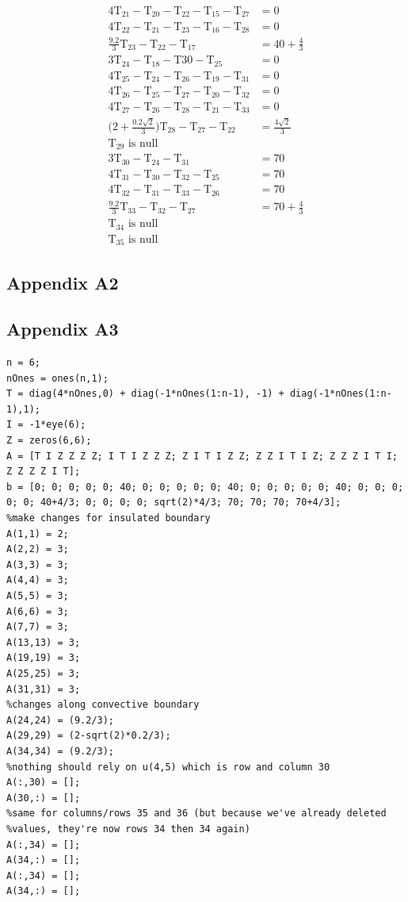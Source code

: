 \documentclass[12pt,a4paper]{article}
\begin{document}
\begin{align*}
4\text{T}_{21}-\text{T}_{20}-\text{T}_{22}-\text{T}_{15}-\text{T}_{27} & =0\\
4\text{T}_{22}-\text{T}_{21}-\text{T}_{23}-\text{T}_{16}-\text{T}_{28} & =0\\
\frac{9.2}{3}\text{T}_{23}-\text{T}_{22}-\text{T}_{17} & =40+\frac{4}{3}\\
3\text{T}_{24}-\text{T}_{18}-\text{T}{30}-\text{T}_{25} &=0\\
4\text{T}_{25}-\text{T}_{24}-\text{T}_{26}-\text{T}_{19}-\text{T}_{31} & =0\\
4\text{T}_{26}-\text{T}_{25}-\text{T}_{27}-\text{T}_{20}-\text{T}_{32} & =0\\
4\text{T}_{27}-\text{T}_{26}-\text{T}_{28}-\text{T}_{21}-\text{T}_{33} & =0\\
\bigg(2+\frac{0.2\sqrt{2}}{3}\bigg)\text{T}_{28}-\text{T}_{27}-\text{T}_{22} & =\frac{4\sqrt{2}}{3}\\
\text{T}_{29} \text{ is null}\\
3\text{T}_{30}-\text{T}_{24}-\text{T}_{31} &=70\\
4\text{T}_{31}-\text{T}_{30}-\text{T}_{32}-\text{T}_{25} &=70\\
4\text{T}_{32}-\text{T}_{31}-\text{T}_{33}-\text{T}_{26} &=70\\
\frac{9.2}{3}\text{T}_{33}-\text{T}_{32}-\text{T}_{27} & =70+\frac{4}{3}\\
\text{T}_{34} \text{ is null}\\
\text{T}_{35} \text{ is null}
\end{align*}
\subsection*{Appendix A2}
\pagebreak
\subsection*{Appendix A3}
\begin{verbatim}
n = 6;
nOnes = ones(n,1);
T = diag(4*nOnes,0) + diag(-1*nOnes(1:n-1), -1) + diag(-1*nOnes(1:n-1),1);
I = -1*eye(6);
Z = zeros(6,6);
A = [T I Z Z Z Z; I T I Z Z Z; Z I T I Z Z; Z Z I T I Z; Z Z Z I T I; Z Z Z Z I T];
b = [0; 0; 0; 0; 0; 40; 0; 0; 0; 0; 0; 40; 0; 0; 0; 0; 0; 40; 0; 0; 0; 0; 0; 40+4/3; 0; 0; 0; 0; sqrt(2)*4/3; 70; 70; 70; 70+4/3];
%make changes for insulated boundary
A(1,1) = 2;
A(2,2) = 3;
A(3,3) = 3;
A(4,4) = 3;
A(5,5) = 3;
A(6,6) = 3;
A(7,7) = 3;
A(13,13) = 3;
A(19,19) = 3;
A(25,25) = 3;
A(31,31) = 3;
%changes along convective boundary
A(24,24) = (9.2/3);
A(29,29) = (2-sqrt(2)*0.2/3);
A(34,34) = (9.2/3);
%nothing should rely on u(4,5) which is row and column 30
A(:,30) = [];
A(30,:) = [];
%same for columns/rows 35 and 36 (but because we've already deleted
%values, they're now rows 34 then 34 again)
A(:,34) = [];
A(34,:) = [];
A(:,34) = [];
A(34,:) = [];
\end{verbatim}
\end{document}
